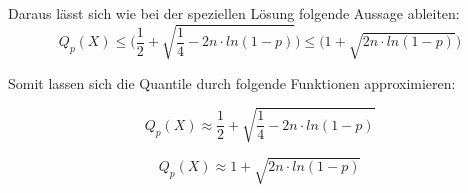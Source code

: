 \documentclass[../main.tex]{subfiles}
\begin{document}
\begin{flushleft}
        Daraus lässt sich wie bei der speziellen Lösung folgende Aussage ableiten:
        \begin{equation}
            Q_{ p }(X) \leq \bigg( \frac{ 1 }{ 2 } + \sqrt{ \frac{ 1 }{ 4 } - 2n\cdot ln(1-p)} \bigg) \leq \bigg(1+\sqrt{ 2n\cdot ln(1-p) }\bigg)
        \end{equation}

        Somit lassen sich die Quantile durch folgende Funktionen approximieren:

        \begin{equation}
            Q_{ p }(X) \approx \frac{ 1 }{ 2 } + \sqrt{ \frac{ 1 }{ 4 } - 2n\cdot ln(1-p)}
        \end{equation}

        \begin{equation}
            Q_{ p }(X) \approx 1+\sqrt{ 2n\cdot ln(1-p) }
        \end{equation}


    \end{flushleft}
\end{document}
